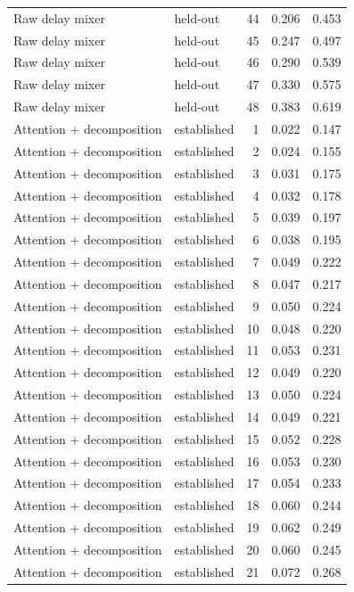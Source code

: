 \begin{tabular}{llrrr}
Raw delay mixer & held-out & 44 & 0.206 & 0.453 \\
Raw delay mixer & held-out & 45 & 0.247 & 0.497 \\
Raw delay mixer & held-out & 46 & 0.290 & 0.539 \\
Raw delay mixer & held-out & 47 & 0.330 & 0.575 \\
Raw delay mixer & held-out & 48 & 0.383 & 0.619 \\
Attention + decomposition & established & 1 & 0.022 & 0.147 \\
Attention + decomposition & established & 2 & 0.024 & 0.155 \\
Attention + decomposition & established & 3 & 0.031 & 0.175 \\
Attention + decomposition & established & 4 & 0.032 & 0.178 \\
Attention + decomposition & established & 5 & 0.039 & 0.197 \\
Attention + decomposition & established & 6 & 0.038 & 0.195 \\
Attention + decomposition & established & 7 & 0.049 & 0.222 \\
Attention + decomposition & established & 8 & 0.047 & 0.217 \\
Attention + decomposition & established & 9 & 0.050 & 0.224 \\
Attention + decomposition & established & 10 & 0.048 & 0.220 \\
Attention + decomposition & established & 11 & 0.053 & 0.231 \\
Attention + decomposition & established & 12 & 0.049 & 0.220 \\
Attention + decomposition & established & 13 & 0.050 & 0.224 \\
Attention + decomposition & established & 14 & 0.049 & 0.221 \\
Attention + decomposition & established & 15 & 0.052 & 0.228 \\
Attention + decomposition & established & 16 & 0.053 & 0.230 \\
Attention + decomposition & established & 17 & 0.054 & 0.233 \\
Attention + decomposition & established & 18 & 0.060 & 0.244 \\
Attention + decomposition & established & 19 & 0.062 & 0.249 \\
Attention + decomposition & established & 20 & 0.060 & 0.245 \\
Attention + decomposition & established & 21 & 0.072 & 0.268 \\

\end{tabular}
